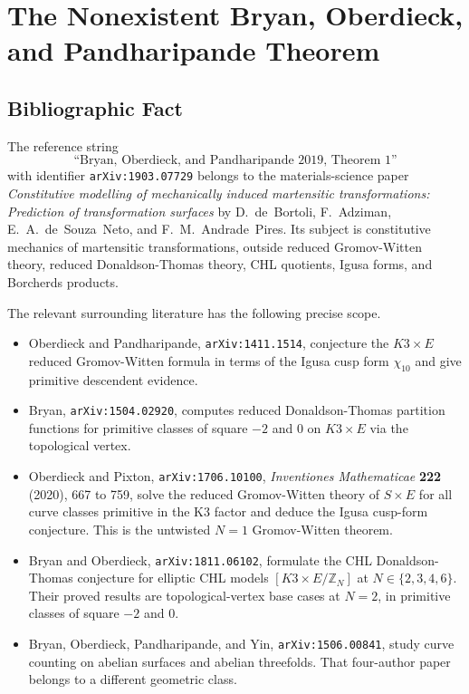 \providecommand{\kBKM}{\kappa_{\mathrm{BKM}}}
\providecommand{\kch}{\kappa_{\mathrm{ch}}}
\providecommand{\kcat}{\kappa_{\mathrm{cat}}}
\providecommand{\kfib}{\kappa_{\mathrm{fiber}}}

\section*{The Nonexistent Bryan, Oberdieck, and Pandharipande Theorem}

\subsection*{Bibliographic Fact}

The reference string
\[
\text{``Bryan, Oberdieck, and Pandharipande 2019, Theorem 1''}
\]
with identifier \texttt{arXiv:1903.07729} belongs to the
materials-science paper
\emph{Constitutive modelling of mechanically induced martensitic
transformations: Prediction of transformation surfaces} by
D.~de~Bortoli, F.~Adziman, E.~A.~de~Souza~Neto, and
F.~M.~Andrade~Pires.  Its subject is constitutive mechanics of
martensitic transformations, outside reduced Gromov-Witten theory,
reduced Donaldson-Thomas theory, CHL quotients, Igusa forms, and
Borcherds products.

The relevant surrounding literature has the following precise scope.

\begin{itemize}
\item Oberdieck and Pandharipande, \texttt{arXiv:1411.1514},
conjecture the $K3\times E$ reduced Gromov-Witten formula in terms of
the Igusa cusp form $\chi_{10}$ and give primitive descendent evidence.

\item Bryan, \texttt{arXiv:1504.02920}, computes reduced
Donaldson-Thomas partition functions for primitive classes of square
$-2$ and $0$ on $K3\times E$ via the topological vertex.

\item Oberdieck and Pixton, \texttt{arXiv:1706.10100},
\emph{Inventiones Mathematicae} \textbf{222} (2020), 667 to 759, solve
the reduced Gromov-Witten theory of $S\times E$ for all curve classes
primitive in the K3 factor and deduce the Igusa cusp-form conjecture.
This is the untwisted $N=1$ Gromov-Witten theorem.

\item Bryan and Oberdieck, \texttt{arXiv:1811.06102}, formulate the
CHL Donaldson-Thomas conjecture for elliptic CHL models
$[K3\times E/\mathbb{Z}_N]$ at $N\in\{2,3,4,6\}$.  Their proved
results are topological-vertex base cases at $N=2$, in primitive
classes of square $-2$ and $0$.

\item Bryan, Oberdieck, Pandharipande, and Yin,
\texttt{arXiv:1506.00841}, study curve counting on abelian surfaces
and abelian threefolds.  That four-author paper belongs to a different
geometric class.
\end{itemize}

